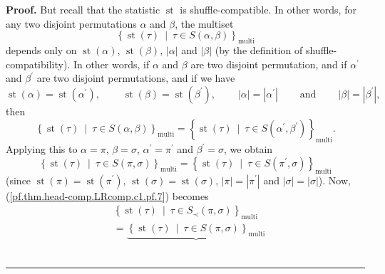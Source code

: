 \documentclass[numbers=enddot,12pt,final,onecolumn,notitlepage]{scrartcl}%
\theoremstyle{definition}
\newenvironment{proof}[1][Proof]{\noindent\textbf{#1.} }{\ \rule{0.5em}{0.5em}}
\begin{document}
\begin{proof}
But recall that the statistic $\operatorname*{st}$ is shuffle-compatible. In
other words, for any two disjoint permutations $\alpha$ and $\beta$, the
multiset%
\[
\left\{  \operatorname*{st}\left(  \tau\right)  \ \mid\ \tau\in S\left(
\alpha,\beta\right)  \right\}  _{\operatorname*{multi}}%
\]
depends only on $\operatorname*{st}\left(  \alpha\right)  $,
$\operatorname*{st}\left(  \beta\right)  $, $\left\vert \alpha\right\vert $
and $\left\vert \beta\right\vert $ (by the definition of
shuffle-compatibility). In other words, if $\alpha$ and $\beta$ are two
disjoint permutation, and if $\alpha^{\prime}$ and $\beta^{\prime}$ are two
disjoint permutations, and if we have%
\[
\operatorname*{st}\left(  \alpha\right)  =\operatorname*{st}\left(
\alpha^{\prime}\right)  ,\ \ \ \ \ \ \ \ \ \ \operatorname*{st}\left(
\beta\right)  =\operatorname*{st}\left(  \beta^{\prime}\right)
,\ \ \ \ \ \ \ \ \ \ \left\vert \alpha\right\vert =\left\vert \alpha^{\prime
}\right\vert \ \ \ \ \ \ \ \ \ \ \text{and}\ \ \ \ \ \ \ \ \ \ \left\vert
\beta\right\vert =\left\vert \beta^{\prime}\right\vert ,
\]
then%
\[
\left\{  \operatorname*{st}\left(  \tau\right)  \ \mid\ \tau\in S\left(
\alpha,\beta\right)  \right\}  _{\operatorname*{multi}}=\left\{
\operatorname*{st}\left(  \tau\right)  \ \mid\ \tau\in S\left(  \alpha
^{\prime},\beta^{\prime}\right)  \right\}  _{\operatorname*{multi}}.
\]
Applying this to $\alpha=\pi$, $\beta=\sigma$, $\alpha^{\prime}=\pi^{\prime}$
and $\beta^{\prime}=\sigma$, we obtain
\begin{equation}
\left\{  \operatorname*{st}\left(  \tau\right)  \ \mid\ \tau\in S\left(
\pi,\sigma\right)  \right\}  _{\operatorname*{multi}}=\left\{
\operatorname*{st}\left(  \tau\right)  \ \mid\ \tau\in S\left(  \pi^{\prime
},\sigma\right)  \right\}  _{\operatorname*{multi}}
\label{pf.thm.head-comp.LRcomp.c1.pf.9}%
\end{equation}
(since $\operatorname*{st}\left(  \pi\right)  =\operatorname*{st}\left(
\pi^{\prime}\right)  $, $\operatorname*{st}\left(  \sigma\right)
=\operatorname*{st}\left(  \sigma\right)  $, $\left\vert \pi\right\vert
=\left\vert \pi^{\prime}\right\vert $ and $\left\vert \sigma\right\vert
=\left\vert \sigma\right\vert $). Now, (\ref{pf.thm.head-comp.LRcomp.c1.pf.7})
becomes%
\begin{align*}
&  \left\{  \operatorname*{st}\left(  \tau\right)  \ \mid\ \tau\in S_{\prec
}\left(  \pi,\sigma\right)  \right\}  _{\operatorname*{multi}}\\
&  =\underbrace{\left\{  \operatorname*{st}\left(  \tau\right)  \ \mid
\ \tau\in S\left(  \pi,\sigma\right)  \right\}  _{\operatorname*{multi}}%
}
\end{align*}
\end{proof}
\end{document}

